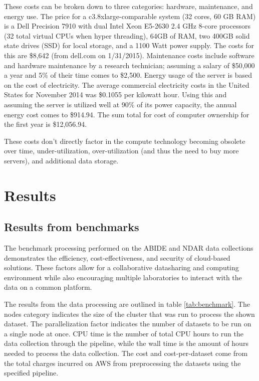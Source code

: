 \documentclass{frontiersSCNS} %
\begin{document}
These costs can be broken down to three categories: hardware, maintenance, and energy use. The price for a c3.8xlarge-comparable system (32 cores, 60 GB RAM) is a Dell Precision 7910 with dual Intel Xeon E5-2630 2.4 GHz 8-core processors (32 total virtual CPUs when hyper threading), 64GB of RAM, two 400GB solid state drives (SSD) for local storage, and a 1100 Watt power supply. The costs for this are \$8,642 (from dell.com on 1/31/2015). Maintenance costs include software and hardware maintenance by a research technician; assuming a salary of \$50,000 a year and 5\% of their time comes to \$2,500. Energy usage of the server is based on the cost of electricity. The average commercial electricity costs in the United States for November 2014 was \$0.1055 per kilowatt hour. Using this and assuming the server is utilized well at 90\% of its power capacity, the annual energy cost comes to \$914.94. The sum total for cost of computer ownership for the first year is \$12,056.94.


These costs don’t directly factor in the compute technology becoming obsolete over time, under-utilization, over-utilization (and thus the need to buy more servers), and additional data storage.

\section{Results}

\subsection{Results from benchmarks}
The benchmark processing performed on the ABIDE and NDAR data collections demonstrates the efficiency, cost-effectiveness, and security of cloud-based solutions. These factors allow for a collaborative datasharing and computing environment while also encouraging multiple laboratories to interact with the data on a common platform.

The results from the data processing are outlined in table \ref{tab:benchmark}. The nodes category indicates the size of the cluster that was run to process the shown dataset. The parallelization factor indicates the number of datasets to be run on a single node at once. CPU time is the number of total CPU hours to run the data collection through the pipeline, while the wall time is the amount of hours needed to process the data collection. The cost and cost-per-dataset come from the total charges incurred on AWS from preprocessing the datasets using the specified pipeline.
\end{document}

